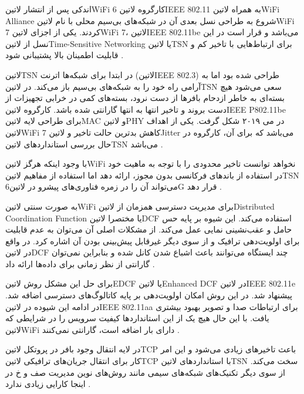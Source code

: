 
اندکی پس از انتشار ‌لاتین{WiFi 6} کارگروه ‌لاتین{IEEE 802.11} به همراه ‌لاتین{WiFi Alliance} شروع به طراحی نسل بعدی آن در شبکه‌های بی‌سیم محلی با نام ‌لاتین{WiFi 7} کردند.
یکی از اجزای ‌لاتین{WiFi 7}، ‌لاتین{IEEE 802.11be} می‌باشد و قرار است در این نسل از ‌لاتین{Time-Sensitive Networking} یا ‌لاتین{TSN} برای ارتباط‌هایی با تاخیر کم و قابلیت
اطمینان بالا پشتیبانی شود
.

‌لاتین{TSN} در ابتدا برای شبکه‌ها اترنت (‌لاتین{IEEE 802.3}) طراحی شده بود اما به آرامی راه خود را به شبکه‌های بی‌سیم باز می‌کند. در ‌لاتین{TSN} سعی می‌شود
هیچ بسته‌ای به خاطر ازدحام بافرها از دست نرود، بسته‌های کمی در خرابی تجهیزات از دست بروند و تاخیر انتها به انتها گارانتی شده باشد.
کارگروه ‌لاتین{IEEE P802.11be} برای طراحی لایه ‌لاتین{MAC} و ‌لاتین{PHY} در می ۲۰۱۹ شکل گرفت. یکی از اهداف ‌لاتین{WiFi 7} کاهش بدترین حالت تاخیر و ‌لاتین{Jitter} می‌باشد
که برای آن، کارگروه در حال بررسی استانداردهای ‌لاتین{TSN} می‌باشد
.

با وجود اینکه هرگز ‌لاتین{WiFi} نخواهد توانست تاخیر محدودی را با توجه به ماهیت خود در استفاده از باندهای فرکانسی بدون مجوز، ارائه دهد اما استفاده از مفاهیم ‌لاتین{TSN}
می‌تواند آن را در زمره فناوری‌های پیشرو در ‌لاتین{6G} قرار دهد
.

به صورت سنتی ‌لاتین{WiFi} برای مدیریت دسترسی همزمان از ‌لاتین{Distributed Coordination Function} یا مختصرا ‌لاتین{DCF} استفاده می‌کند.
این شیوه بر پایه حس حامل و عقب‌نشینی نمایی عمل می‌کند. از مشکلات اصلی آن می‌توان به عدم قابلیت برای اولویت‌دهی ترافیک و از سوی دیگر غیرقابل پیش‌بینی بودن
آن اشاره کرد. در واقع در ‌لاتین{DCF} چند ایستگاه می‌توانند باعث اشباع شدن کانل شده و بنابراین نمی‌توان گارانتی از نظر زمانی برای داده‌ها ارائه داد
.

برای حل این مشکل روش ‌لاتین{EDCF} یا ‌لاتین{Enhanced DCF} در ‌لاتین{IEEE 802.11e} پیشنهاد شد. در این روش امکان اولویت‌دهی بر پایه
کاتالوگ‌های دسترسی اضافه شد. در ادامه این شیوده در ‌لاتین{IEEE 802.11aa} برای ارتباطات صدا و تصویر بهبود بیشتری یافت.
با این حال هیچ یک از این استانداردها کیفیت سرویس را در شرایطی که ‌لاتین{WiFi} دارای بار اضافه است، گارانتی نمی‌کنند
.

در لایه انتقال وجود بافر در پروتکل ‌لاتین{TCP} باعث تاخیرهای زیادی می‌شود و این امر کار برای انتقال جریان‌های ترافیکی ‌لاتین{TCP}
با استانداردهای ‌لاتین{TSN} سخت می‌کند. از سوی دیگر تکنیک‌های شبکه‌های سیمی مانند روش‌های نوین مدیریت صف و ‌خ در اینجا
کارایی زیادی ندارد
.

